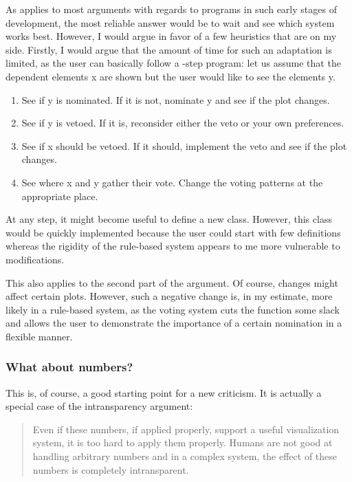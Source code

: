 \documentclass[]{report}
\providecommand{\tightlist}{%
  \setlength{\itemsep}{0pt}\setlength{\parskip}{0pt}}
\theoremstyle{definition}
\theoremstyle{definition}
\theoremstyle{definition}
\theoremstyle{remark}
\begin{document}
As applies to most arguments with regards to programs in such early
stages of development, the most reliable answer would be to wait and see
which system works best. However, I would argue in favor of a few
heuristics that are on my side. Firstly, I would argue that the amount
of time for such an adaptation is limited, as the user can basically
follow a -step program: let us assume that the dependent elements x are
shown but the user would like to see the elements y.

\begin{enumerate}
\def\labelenumi{\arabic{enumi}.}
\tightlist
\item
  See if y is nominated. If it is not, nominate y and see if the plot
  changes.
\item
  See if y is vetoed. If it is, reconsider either the veto or your own
  preferences.
\item
  See if x should be vetoed. If it should, implement the veto and see if
  the plot changes.
\item
  See where x and y gather their vote. Change the voting patterns at the
  appropriate place.
\end{enumerate}

At any step, it might become useful to define a new class. However, this
class would be quickly implemented because the user could start with few
definitions whereas the rigidity of the rule-based system appears to me
more vulnerable to modifications.

This also applies to the second part of the argument. Of course, changes
might affect certain plots. However, such a negative change is, in my
estimate, more likely in a rule-based system, as the voting system cuts
the function some slack and allows the user to demonstrate the
importance of a certain nomination in a flexible manner.

\subsubsection{What about numbers?}\label{what-about-numbers}

This is, of course, a good starting point for a new criticism. It is
actually a special case of the intransparency argument:

\begin{quote}
Even if these numbers, if applied properly, support a useful
visualization system, it is too hard to apply them properly. Humans are
not good at handling arbitrary numbers and in a complex system, the
effect of these numbers is completely intransparent.
\end{quote}
\end{document}

